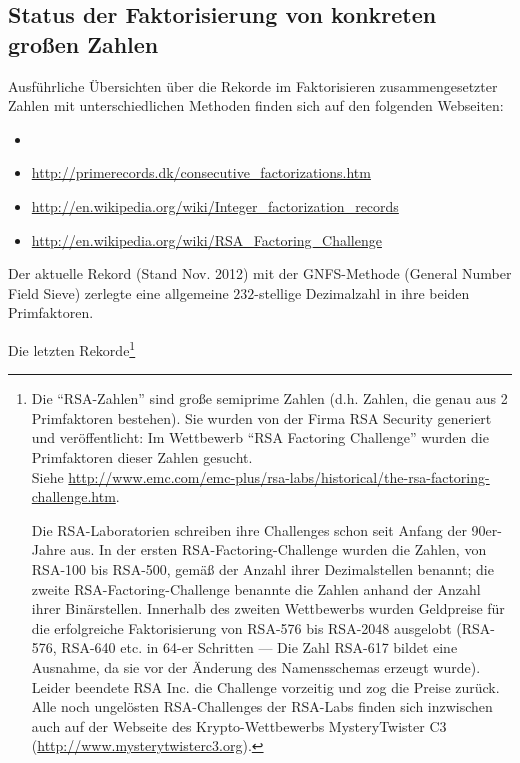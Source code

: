 \begin{refsegment}
\subsection{Status der Faktorisierung von konkreten großen Zahlen}
\label{nt:NoteFactorization}

Ausführliche Übersichten über die Rekorde im Faktorisieren
zusammengesetzter Zahlen 
mit unterschiedlichen Methoden finden sich auf den folgenden Webseiten:
\begin{itemize}[nosep,label=-]
\item
\item     \url{http://primerecords.dk/consecutive_factorizations.htm}\\
\item     \url{http://en.wikipedia.org/wiki/Integer_factorization_records}\\
\item     \url{http://en.wikipedia.org/wiki/RSA_Factoring_Challenge}
\end{itemize}

Der aktuelle Rekord (Stand Nov. 2012) mit der GNFS-Methode (General Number
Field Sieve)  zerlegte eine
allgemeine $232$-stellige Dezimalzahl in ihre beiden Primfaktoren.

Die letzten Rekorde\footnote{%
Die  "`RSA-Zahlen"' sind große semiprime Zahlen (d.h. Zahlen, die genau aus
2 Primfaktoren bestehen).
Sie wurden von der Firma RSA Security generiert und veröffentlicht: Im
Wettbewerb "`RSA Factoring Challenge"' wurden die Primfaktoren dieser Zahlen gesucht.\\
Siehe \url{http://www.emc.com/emc-plus/rsa-labs/historical/the-rsa-factoring-challenge.htm}.

Die RSA-Laboratorien schreiben ihre Challenges schon seit Anfang der
90er-Jahre aus. In der ersten RSA-Factoring-Challenge wurden die Zahlen, von RSA-100 bis
RSA-500, gemäß der Anzahl ihrer Dezimalstellen benannt; die zweite
RSA-Factoring-Challenge benannte die Zahlen anhand der Anzahl ihrer
Binärstellen. Innerhalb des zweiten Wettbewerbs wurden Geldpreise für die
erfolgreiche Faktorisierung von RSA-576 bis RSA-2048 ausgelobt (RSA-576, RSA-640
etc. in 64-er Schritten --- Die Zahl RSA-617 bildet eine Ausnahme, da sie
vor der Änderung des Namensschemas erzeugt wurde).
Leider beendete RSA Inc. die Challenge vorzeitig und zog die Preise zurück.
Alle noch ungelösten RSA-Challenges der RSA-Labs finden sich inzwischen auch
auf der Webseite des Krypto-Wettbewerbs \glqq MysteryTwister C3\grqq~
(\url{http://www.mysterytwisterc3.org}).

}
\end{refsegment}
